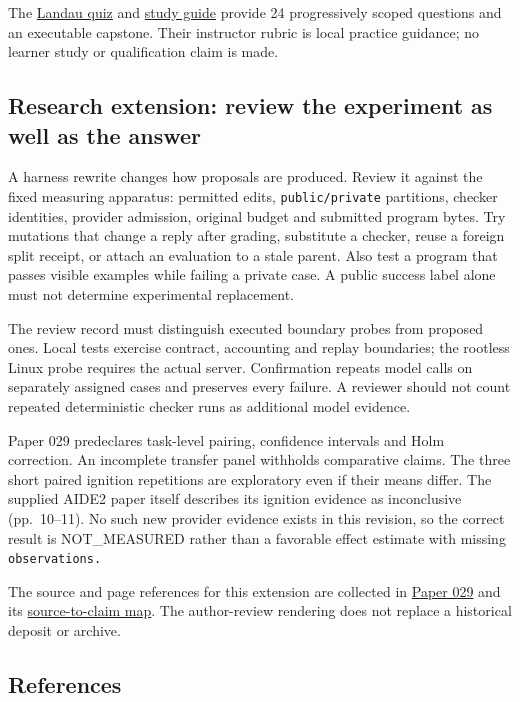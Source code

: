 \documentclass[
  11pt,
]{article}
\begin{document}
The \href{_lev_landau_theoretical_minimum_quiz/quiz.md}{Landau quiz} and
\href{_lev_landau_theoretical_minimum_quiz/study_guide.md}{study guide}
provide 24 progressively scoped questions and an executable capstone.
Their instructor rubric is local practice guidance; no learner study or
qualification claim is made.

\subsection{Research extension: review the experiment as well as the
answer}\label{research-extension-review-the-experiment-as-well-as-the-answer}

A harness rewrite changes how proposals are produced. Review it against
the fixed measuring apparatus: permitted edits,
\nolinkurl{public/private} partitions, checker identities, provider
admission, original budget and submitted program bytes. Try mutations
that change a reply after grading, substitute a checker, reuse a foreign
split receipt, or attach an evaluation to a stale parent. Also test a
program that passes visible examples while failing a private case. A
public success label alone must not determine experimental replacement.

The review record must distinguish executed boundary probes from
proposed ones. Local tests exercise contract, accounting and replay
boundaries; the rootless Linux probe requires the actual server.
Confirmation repeats model calls on separately assigned cases and
preserves every failure. A reviewer should not count repeated
deterministic checker runs as additional model evidence.

Paper 029 predeclares task-level pairing, confidence intervals and Holm
correction. An incomplete transfer panel withholds comparative claims.
The three short paired ignition repetitions are exploratory even if
their means differ. The supplied AIDE2 paper itself describes its
ignition evidence as inconclusive (pp.~10--11). No such new provider
evidence exists in this revision, so the correct result is NOT\_MEASURED
rather than a favorable effect estimate with missing
\nolinkurl{observations.}

The source and page references for this extension are collected in
\href{../029/paper.pdf}{Paper 029} and its
\href{../029/docs/source_to_claim_map.md}{source-to-claim map}. The
author-review rendering does not replace a historical deposit or
archive.

\subsection{References}\label{references}
\end{document}
